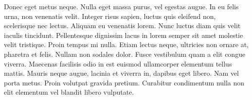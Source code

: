 \documentclass[10pt,oneside]{article}
\begin{document}
Donec eget metus neque. Nulla eget massa purus, vel egestas augue. In eu felis urna, non venenatis velit. Integer risus sapien, luctus quis eleifend non, scelerisque nec lectus. Aliquam eu venenatis lorem. Nunc luctus diam quis velit iaculis tincidunt. Pellentesque dignissim lacus in lorem semper sit amet molestie velit tristique. Proin tempus mi nulla. Etiam lectus neque, ultricies non ornare at, pharetra et felis. Nullam non sodales dolor. Fusce vestibulum quam a elit congue viverra. Maecenas facilisis odio in est euismod ullamcorper elementum tellus mattis. Mauris neque augue, lacinia et viverra in, dapibus eget libero. Nam vel porta metus. Proin volutpat gravida pretium. Curabitur condimentum nulla non elit elementum vel blandit libero vulputate. 



\end{document}
